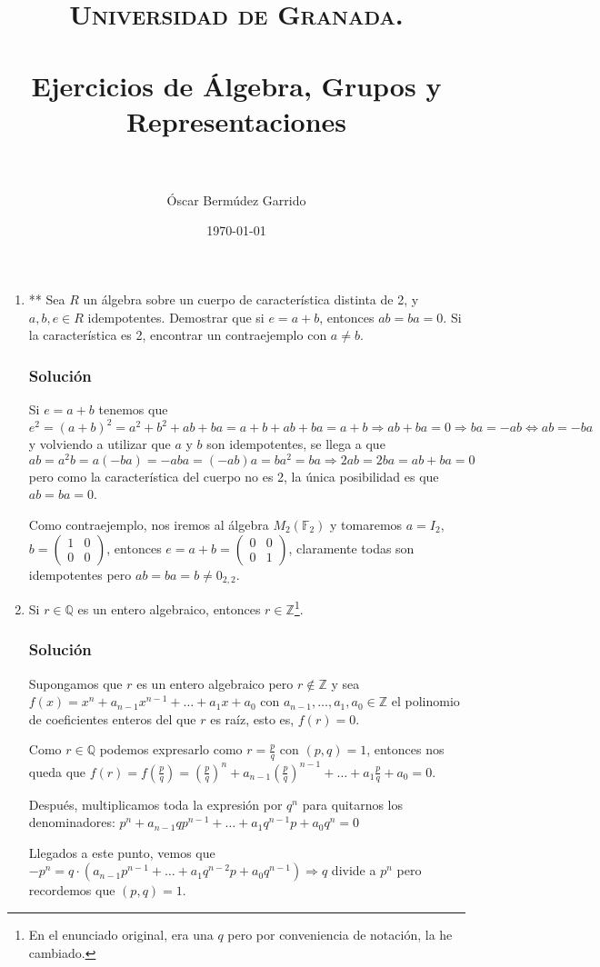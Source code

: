 \documentclass[paper=a4, fontsize=11pt, spanish]{scrartcl}
\title{
  \normalfont \normalsize 
  \textsc{Universidad de Granada.} \\ [25pt] %
  \horrule{0.5pt} \\[0.4cm] %
  \huge Ejercicios de Álgebra, Grupos y Representaciones \\ %
  \horrule{2pt} \\[0.5cm] %
}
\author{Óscar Bermúdez Garrido} %
\date{\normalsize\today} %
\begin{document}
	\maketitle %
	
	\newpage

	\begin{enumerate}
		\item ** Sea $R$ un álgebra sobre un cuerpo de característica distinta de 2, y $a, b, e \in R$ idempotentes.
		Demostrar que si $e = a + b$, entonces $ab = ba = 0$. Si la característica es 2, encontrar un contraejemplo
		con $a \neq b$.
		\subsubsection*{Solución}
		Si $e = a+b$ tenemos que $e^2 = (a+b)^2 = a^2 + b^2 + ab + ba = a + b + ab + ba = a+b \Rightarrow ab + ba
		= 0 \Rightarrow ba = -ab \Leftrightarrow ab = -ba$ y volviendo a utilizar que $a$ y $b$ son idempotentes,
		se llega a que $ab = a^2b = a(-ba) = -aba = (-ab)a = ba^2 = ba \Rightarrow 2ab = 2ba = ab + ba = 0$ pero
		como la característica del cuerpo no es 2, la única posibilidad es que $ab = ba = 0$.
		
		Como contraejemplo, nos iremos al álgebra $M_2(\mathbb{F}_2)$ y tomaremos $a = I_2$, $\displaystyle b =
		\begin{pmatrix} 1 & 0 \\ 0 & 0 \end{pmatrix}$, entonces $\displaystyle e = a+b = \begin{pmatrix} 0 & 0
		\\ 0 & 1 \end{pmatrix}$, claramente todas son idempotentes pero $ab = ba = b \neq 0_{2,2}$.
	
		\item Si $r \in \mathbb{Q}$ es un entero algebraico, entonces $r \in \mathbb{Z}$\footnote{En el enunciado
		original, era una $q$ pero por conveniencia de notación, la he cambiado.}.
		\subsubsection*{Solución}
		Supongamos que $r$ es un entero algebraico pero $r \notin \mathbb{Z}$ y sea $f(x) = x^n + a_{n-1}x^{n-1}
		+ \dots + a_1x + a_0$ con $a_{n-1}, \dots, a_1, a_0 \in \mathbb{Z}$ el polinomio de coeficientes enteros
		del que $r$ es raíz, esto es, $f(r) = 0$.
		
		Como $r \in \mathbb{Q}$ podemos expresarlo como $\displaystyle r = \frac{p}{q}$ con $(p, q) = 1$, entonces
		nos queda que $\displaystyle f(r) = f\left(\frac{p}{q}\right) = \left(\frac{p}{q}\right)^n + a_{n-1}
		\left(\frac{p}{q}\right)^{n-1} + \dots + a_1\frac{p}{q} + a_0 = 0$.
		
		Después, multiplicamos toda la expresión por $q^n$ para quitarnos los denominadores: $p^n + a_{n-1}qp^{n-1}
		+ \dots + a_1q^{n-1}p + a_0q^n = 0$
		
		Llegados a este punto, vemos que $-p^n = q \cdot \left(a_{n-1}p^{n-1} + \dots + a_1q^{n-2}p + a_0q^{n-1}\right)
		\Rightarrow q$ divide a $p^n$ pero recordemos que $(p, q) = 1$.
	\end{enumerate}
\end{document}
